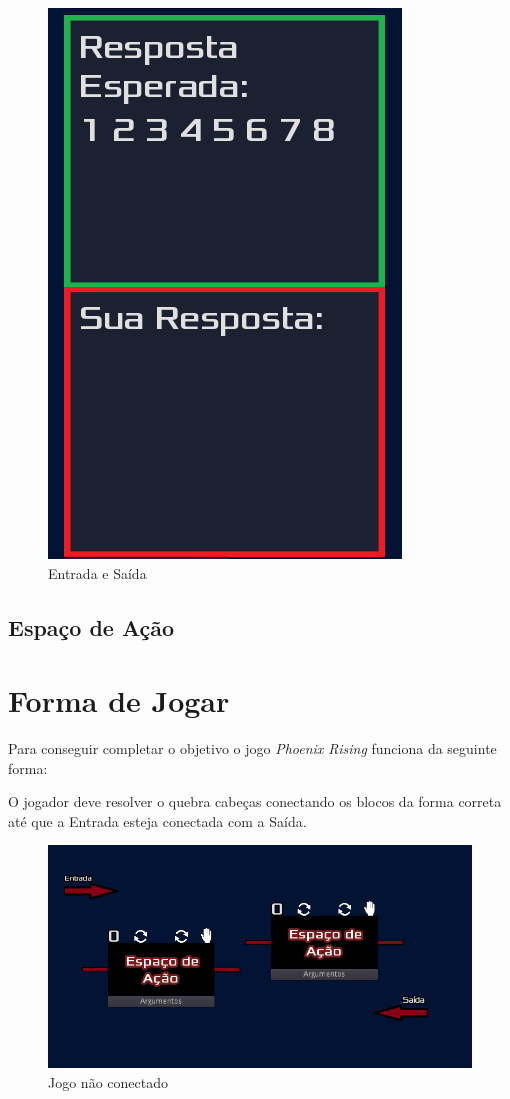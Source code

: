 \begin{figure}
\begin{minipage}{.4\textwidth}
      \includegraphics[scale=0.3]{../figuras/exemplo_saida.png}
    \end{minipage}
    \caption{Entrada e Saída}
\end{figure}

\subsection{Espaço de Ação}

\section{Forma de Jogar}
\label{sec:consideracoes_preliminares}

Para conseguir completar o objetivo o jogo \textit{Phoenix Rising} funciona
da seguinte forma:

O jogador deve resolver o quebra cabeças conectando os blocos da forma correta
até que a Entrada esteja conectada com a Saída.

\begin{figure}[H]
    \includegraphics[width=\textwidth]{../figuras/jogo_nao_conectado.png}
    \caption{Jogo não conectado}
\end{figure}

